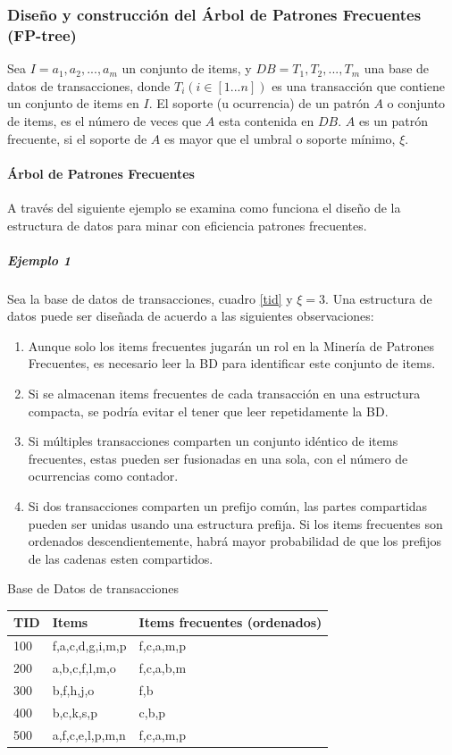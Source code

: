 \subsubsection{Dise\~no y construcci\'on del \'Arbol de Patrones Frecuentes (FP-tree)}
Sea $I={a_{1},a_{2},...,a_{m}}$ un conjunto de items, y $DB={T_{1},T_{2},...,T_{m}}$ una base de datos de
transacciones, donde $T_{i}(i \in [1...n])$ es una transacci\'on que contiene un conjunto de items en $I$. El
soporte (u ocurrencia) de un patr\'on $A$ o conjunto de items, es el n\'umero de veces que $A$ esta contenida en
$DB$. $A$ es un patr\'on frecuente, si el soporte de $A$ es mayor que el umbral o soporte m\'inimo, $\xi$.

\paragraph{\'Arbol de Patrones Frecuentes}
A trav\'es del siguiente ejemplo se examina como funciona el dise\~no de la estructura de datos para minar con
eficiencia patrones frecuentes.

\subparagraph{Ejemplo 1}
Sea la base de datos de transacciones, cuadro \ref{tid} y $\xi=3$. Una estructura de datos puede ser dise\~nada de
acuerdo a las siguientes observaciones:
\begin{enumerate}
\item Aunque solo los items frecuentes jugar\'an un rol en la Miner\'ia de Patrones Frecuentes, es necesario leer 
la BD para identificar este conjunto de items.
\item Si se almacenan items frecuentes de cada transacci\'on en una estructura compacta, se podr\'ia
evitar el tener que leer repetidamente la BD.
\item Si m\'ultiples transacciones comparten un conjunto id\'entico de items frecuentes, estas pueden ser
fusionadas en una sola, con el n\'umero de ocurrencias como contador.
\item Si dos transacciones comparten un prefijo com\'un, las partes compartidas pueden ser unidas usando una
estructura prefija. Si los items frecuentes son ordenados descendientemente, habr\'a mayor probabilidad de que los
prefijos de las cadenas esten compartidos.
\end{enumerate}

\begin{table}[h]
\caption{Base de Datos de transacciones}
\label{tid}
\end{table}
\begin{center}
\begin{tabular}{|p{25mm}|p{30mm}|p{40mm}|}\hline
\textbf{TID} & \textbf{Items} & \textbf{Items frecuentes (ordenados)}\\ \hline\hline
100 & f,a,c,d,g,i,m,p & f,c,a,m,p\\ \hline
200 & a,b,c,f,l,m,o   & f,c,a,b,m\\ \hline
300 & b,f,h,j,o       & f,b\\ \hline
400 & b,c,k,s,p       & c,b,p\\ \hline
500 & a,f,c,e,l,p,m,n & f,c,a,m,p\\ \hline
\end{tabular}
\end{center}

